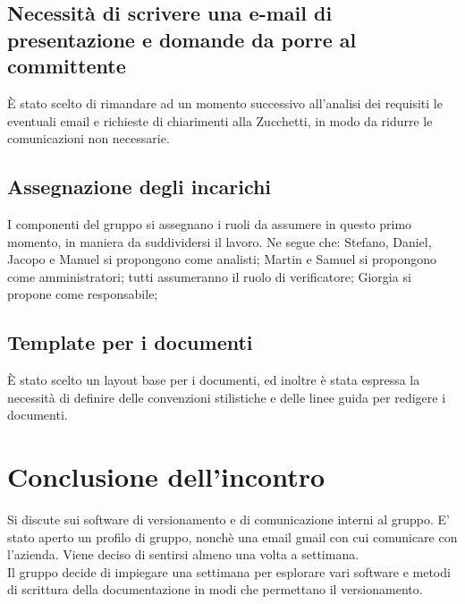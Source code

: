 \documentclass{article}
\begin{document}
\subsection{Necessità di scrivere una e-mail di presentazione e domande da porre al committente}%
\label{sub:piattaforma_trello}
È stato scelto di rimandare ad un momento successivo all’analisi dei requisiti le eventuali email e richieste di chiarimenti alla Zucchetti, in modo da ridurre le comunicazioni non necessarie.

\subsection{Assegnazione degli incarichi}%
\label{sub:mezzo_comunicazione}
I componenti del gruppo si assegnano i ruoli da assumere in questo primo momento, in maniera da suddividersi il lavoro. Ne segue che: Stefano, Daniel, Jacopo e Manuel si propongono come analisti;  Martin e Samuel si propongono come amministratori; tutti assumeranno il ruolo di verificatore; Giorgia si propone come responsabile; 

\subsection{Template per i documenti}%
\label{sub:latex}
È stato scelto un layout base per i documenti, ed inoltre è stata espressa la necessità di definire delle convenzioni stilistiche e delle linee guida per redigere i documenti.

\section{Conclusione dell’incontro}%
\label{sec:conclusione_incontro}
Si discute sui software di versionamento e di comunicazione interni al gruppo. E’ stato aperto un profilo  di gruppo, nonchè una email gmail con cui comunicare con l’azienda. 
Viene deciso di sentirsi almeno una volta a settimana. \\
Il gruppo decide di impiegare una settimana per esplorare vari software e metodi di scrittura della documentazione in modi che permettano il versionamento.
\end{document}
